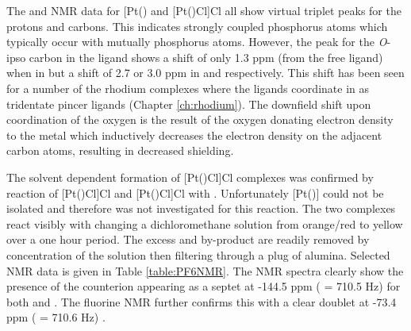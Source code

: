 The \proton{} and \carbon{} NMR data for [Pt(\tBuxantphos)\ce{Cl2}{]} and [Pt(\tBuxantphos)Cl]Cl all show virtual triplet peaks for the \tBu{} protons and carbons.  This indicates strongly coupled phosphorus atoms which typically occur with mutually \trans{} phosphorus atoms.  However, the \carbon{} peak for the \emph{O}-ipso carbon in the \tBuxantphos{} ligand shows a shift of only 1.3 ppm (from the free ligand) when in  but a shift of 2.7 or 3.0 ppm in  and  respectively.  This shift has been seen for a number of the rhodium complexes where the \tBuxantphos{} ligands coordinate in as tridentate \POP{} pincer ligands (Chapter \ref{ch:rhodium}).  The downfield shift upon coordination of the oxygen is the result of the oxygen donating electron density to the metal which inductively decreases the electron density on the adjacent carbon atoms, resulting in decreased shielding.  

The solvent dependent formation of [Pt(\tBuxantphos)Cl]Cl complexes was confirmed by reaction of [Pt(\tBuxantphos)Cl]Cl and [Pt(\tButhixantphos)Cl]Cl with .  Unfortunately [Pt(\tBusixantphos)] could not be isolated and therefore was not investigated for this reaction.  The two complexes react visibly with  changing a dichloromethane solution from orange/red to yellow over a one hour period.  The excess  and  by-product are readily removed by concentration of the solution then filtering through a plug of alumina.  Selected NMR data is given in Table \ref{table:PF6NMR}.  The \phosphorus{} NMR spectra clearly show the presence of the  counterion appearing as a septet at -144.5 ppm (\JPF{} = 710.5 Hz) for both \tButhixantphos{} and \tBuxantphos{}.  The fluorine NMR further confirms this with a clear doublet at -73.4 ppm (\JPF{} = 710.6 Hz) .

